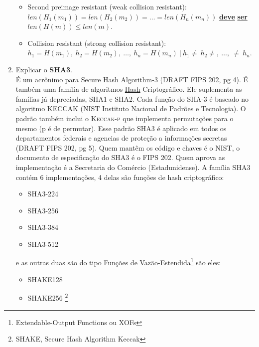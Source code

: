 \documentclass[12pt, a4paper]{article}
\begin{document}
\begin{enumerate}
\begin{itemize}
    \item Second preimage resistant (weak collision resistant): $len(H_1(m_1)) =
    len(H_2(m_2)) = \ldots = len(H_n(m_n))$ \underline{\color{red}
    \textbf{deve}} \underline{\color{red} \textbf{ser}} $len(H(m)) \le
    len(m)$.\\

    \item Collision resistant (strong collision resistant): $h_1 = H(m_1),\
    h_2=H(m_2),\ \ldots,\ h_n=H(m_n)\  \vert\ h_1 \not=\ h_2 \not=,\ \ldots,\
    \not=\ h_n$.\\
  \end{itemize}

\item Explicar o \textbf{SHA3}.\\

\label{sha3-inicial}
É um acrônimo para Secure Hash Algorithm-3 (DRAFT FIPS 202, pg 4). É também uma
família de algoritmos \underline{Hash}-Criptográfico. Ele suplementa as famílias
já depreciadas, SHA1 e SHA2. Cada função do SHA-3 é baseado no algoritmo
\textsc{KECCAK}\cite{keccak} (NIST Instituto Nacional de Padrões e Tecnologia).
O padrão também inclui o \textsc{Keccak-p} que implementa permutações para o
mesmo (p é de permutar). Esse padrão SHA3 é aplicado em todos os departamentos
federais e agencias de proteção a informações secretas (DRAFT FIPS 202, pg 5).
Quem mantêm os código e chaves é o NIST, o documento de especificação do SHA3 é
o FIPS 202. Quem aprova as implementação é a Secretaria do Comércio
(Estadunidense). A família SHA3 contém 6 implementações, 4 delas são funções de
hash criptográfico:\\

  \begin{itemize}
    \item SHA3-224 \item SHA3-256 \item SHA3-384 \item SHA3-512\\
  \end{itemize}

e as outras duas são do tipo Funções de
Vazão-Estendida\footnote{Extendable-Output Functions ou XOFs} são eles:\\

  \begin{itemize}
    \item SHAKE128 \item SHAKE256 \footnote{SHAKE, Secure Hash Algorithm
    Keccak}\\
  \end{itemize}


\end{enumerate}
\end{document}
